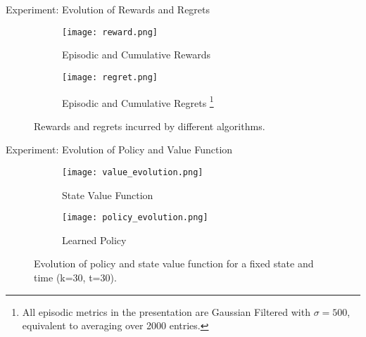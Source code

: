 \begin{frame}{Experiment: Evolution of Rewards and Regrets}
\begin{figure}
    \centering
    \begin{subfigure}{\textwidth}
        \centering
        \texttt{[image: reward.png]}
        \caption{Episodic and Cumulative Rewards}
    \end{subfigure}
    \begin{subfigure}{\textwidth}
        \centering
        \texttt{[image: regret.png]}
        \caption{Episodic and Cumulative Regrets \footnote{All episodic metrics in the presentation are Gaussian Filtered with $\sigma = 500$, equivalent to averaging over 2000 entries.}}
    \end{subfigure}
    \caption{Rewards and regrets incurred by different algorithms.}
\end{figure}
\end{frame}

\begin{frame}{Experiment: Evolution of Policy and Value Function}
\begin{figure}
    \centering
    \begin{subfigure}{\textwidth}
        \centering
        \texttt{[image: value\_evolution.png]}
        \caption{State Value Function}
    \end{subfigure}
    \begin{subfigure}{\textwidth}
        \centering
        \texttt{[image: policy\_evolution.png]}
        \caption{Learned Policy}
    \end{subfigure}
    \caption{Evolution of policy and state value function for a fixed state and time (k=30, t=30).}
\end{figure}
\end{frame}
